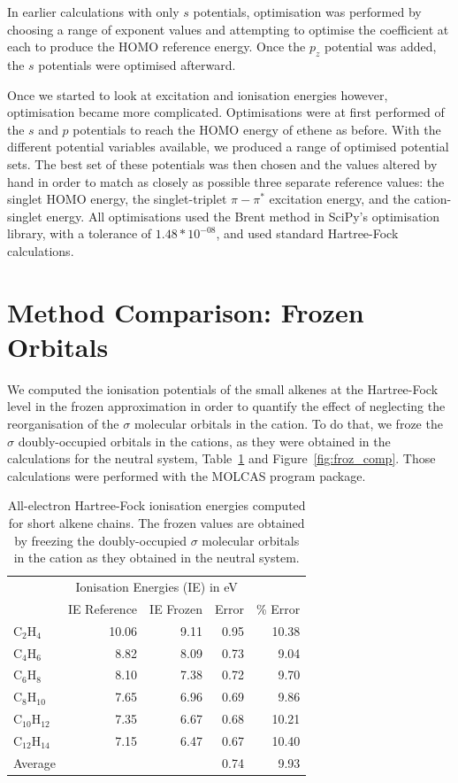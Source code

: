\documentclass[aip]{revtex4-1}
\begin{document}
In earlier calculations with only \(s\) potentials, optimisation was performed by choosing a range of exponent values and attempting to optimise the coefficient at each to produce the HOMO reference energy. Once the \(p_{z}\) potential was added, the \(s\) potentials were optimised afterward. 

Once we started to look at excitation and ionisation energies however, optimisation became more complicated. Optimisations were at first performed of the $s$ and $p$ potentials to reach the HOMO energy of ethene as before. With the different potential variables available, we produced a range of optimised potential sets. The best set of these potentials was then chosen and the values altered by hand in order to match as closely as possible three separate reference values: the singlet HOMO energy, the singlet-triplet \(\pi-\pi^{*}\) excitation energy, and the cation-singlet energy. All optimisations used the Brent method in SciPy's optimisation library, with a tolerance of \(1.48*10^{-08}\), and used standard Hartree-Fock calculations.

\section*{Method Comparison: Frozen Orbitals}

We computed the ionisation potentials of the small alkenes at the Hartree-Fock level in the frozen approximation in order to
quantify the effect of neglecting the reorganisation of the $\sigma$ molecular orbitals in the cation. To do that, we froze
the $\sigma$ doubly-occupied orbitals in the cations, as they were obtained in the calculations for the neutral system, Table~\ref{tab:froz_comp}
and Figure~\ref{fig:froz_comp}.
Those calculations were performed with the MOLCAS program package.

\begin{table} 
\caption{All-electron Hartree-Fock ionisation energies computed for short alkene chains. 
The frozen values are obtained by freezing the doubly-occupied $\sigma$ molecular orbitals in the cation
as they obtained in the neutral system.}
\label{tab:froz_comp}
\begin{tabular}{lrrrr}
\hline
\multicolumn{5}{c}{Ionisation Energies (IE) in eV} \\
              & IE Reference  &  IE Frozen& Error & \% Error \\
\hline
$\text{C}_{2}\text{H}_{4}$  & 10.06  &   9.11 &  0.95  & 10.38 \\
$\text{C}_{4}\text{H}_{6}$  & 8.82   &   8.09 &  0.73  & 9.04 \\
$\text{C}_{6}\text{H}_{8}$  & 8.10   &   7.38 &  0.72  & 9.70 \\
$\text{C}_{8}\text{H}_{10}$ & 7.65   &   6.96 &  0.69  & 9.86 \\
$\text{C}_{10}\text{H}_{12}$& 7.35   &   6.67 &  0.68  & 10.21 \\
$\text{C}_{12}\text{H}_{14}$& 7.15   &   6.47 &  0.67  & 10.40 \\
\hline
Average &&&                        0.74  & 9.93 \\
\hline
\end{tabular}
\end{table} 
\end{document}

